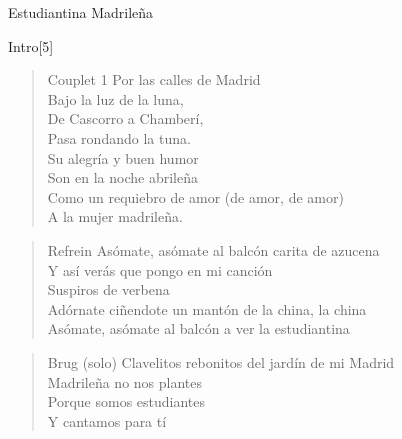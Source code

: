 \begin{song}{Estudiantina Madrileña}

\begin{instrumental}{Intro}[5]
\measure{} \measure{} \measure{}  \measure{} \measure{} \measure{} 
\measure{}  \measure{}  \measure{}   
  \measure{}
\end{instrumental}

\begin{verse}{Couplet 1}
\hspace{2em} Por las calles de Madrid \\
\hspace{2em} Bajo la luz de la luna,\\
De Cascorro a Chamberí,\\
Pasa rondando la tuna.\\

Su alegría y buen humor\\
Son en la noche abrileña\\
Como un requiebro de amor (de amor, de amor)\\
A la mujer madrileña.
\end{verse}

\begin{verse}{Refrein}
Asómate, asómate al balcón carita de azucena \\
Y así verás que pongo en mi canción \\
Suspiros de verbena \\
Adórnate ciñendote un mantón de la china, la china \\
Asómate, asómate al balcón a ver la estudiantina 
\end{verse}

\begin{verse}{Brug (solo)}
Clavelitos rebo\chord{$\sharp\downarrow$}nitos del jardín de mi Madrid \\
Madrileña no nos plantes \\
Porque somos estudiantes \\
Y cantamos para tí
\end{verse}
\end{song}
